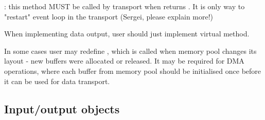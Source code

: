 \item [\func{Read\_CallBack()}] :
   this method MUST be called by transport when  
   returns . It is only way to "restart" event loop in the transport (Sergei, please explain more!)

\ebul

When implementing data output, user should just implement  virtual method.  

In some cases user may redefine , which is called when
memory pool changes its layout - new buffers were allocated or released. 
It may be required for DMA operations, where each buffer from memory pool
should be initialised once before it can be used for data transport.   




\subsection{Input/output objects}




